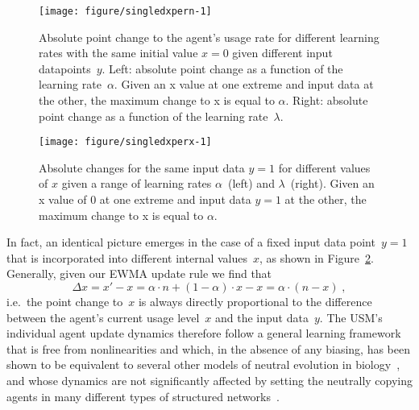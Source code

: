 \begin{figure}[htbp]

{\centering \texttt{[image: figure/singledxpern-1]} 

}

\caption[Absolute point change to the agent's usage rate for different learning rates with the same initial value ]{Absolute point change to the agent's usage rate for different learning rates with the same initial value $x=0$ given different input datapoints~$y$. Left: absolute point change as a function of the learning rate~$\alpha$. Given an x value at one extreme and input data at the other, the maximum change to x is equal to $\alpha$. Right: absolute point change as a function of the learning rate~$\lambda$.}\label{fig:singledxpern}
\end{figure}



\begin{figure}[htbp]

{\centering \texttt{[image: figure/singledxperx-1]} 

}

\caption[Absolute changes for the same input data ]{Absolute changes for the same input data $y=1$ for different values of $x$ given a range of learning rates $\alpha$~(left) and $\lambda$~(right). Given an x value of $0$ at one extreme and input data $y=1$ at the other, the maximum change to x is equal to $\alpha$.}\label{fig:singledxperx}
\end{figure}



In fact, an identical picture emerges in the case of a fixed input data point~$y=1$ that is incorporated into different internal values~$x$, as shown in Figure~\ref{fig:singledxperx}. %
Generally, given our EWMA update rule we find that
\begin{equation}\label{eq:usmdiff}
\Delta x = x'-x = \alpha\cdot n + (1-\alpha)\cdot x - x = \alpha\cdot(n-x)\;,
\end{equation}
i.e.~the point change to~$x$ is always directly proportional to the difference between the agent's current usage level~$x$ and the input data~$y$.
The USM's individual agent update dynamics therefore follow a general learning framework that is free from nonlinearities and which, in the absence of any biasing, has been shown to be equivalent to several other models of neutral evolution in biology~\citep{Blythe2007divided}, and whose dynamics are not significantly affected by setting the neutrally copying agents in many different types of structured networks~\citep[but see \citealt{Kauhanen2016}]{Blythe2010,Blythe2012copying}.

